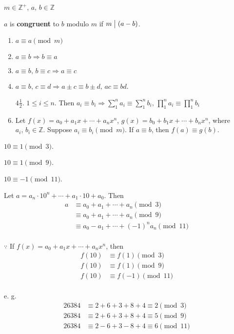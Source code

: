 
\begin{definition}
    $m \in \mathbb{Z}^+$, $a,\,b \in \mathbb{Z}$

    $a$ is \textbf{congruent} to $b$ modulo $m$ if $m \bigm| \left(a-b\right)$.
\end{definition}

\begin{theorem}
    \begin{enumerate}
        \item $a \equiv a\pmod{m}$
        \item $a \equiv b \Rightarrow b \equiv a$
        \item $a \equiv b,\, b \equiv c \Rightarrow a \equiv c$
        \item $a \equiv b,\, c \equiv d \Rightarrow a \pm c \equiv b \pm d,\, ac \equiv bd$.
        \item[$\mathit{4\frac{1}{2}}$.] $1 \leq i \leq n$. Then
        $a_i \equiv b_i \Rightarrow \sum_1^n a_i \equiv \sum_1^n b_i,\, \prod_1^n a_i \equiv \prod_1^n b_i$ 
        \item Let $f\left(x\right) = a_0 + a_1x + \cdots + a_nx^n$, $g\left(x\right) = b_0 + b_1x + \cdots + b_nx^n$,
        where $a_i,\,b_i \in \mathbb{Z}$. Suppose $a_i \equiv b_i\pmod{m}$. If $a \equiv b$, then $f\left(a\right) \equiv g\left(b\right)$.
    \end{enumerate}
\end{theorem}

\begin{example}
    $10 \equiv 1\pmod{3}$.

    $10 \equiv 1\pmod{9}$.
    
    $10 \equiv -1\pmod{11}$.

    Let $a=a_n \cdot 10^n+\cdots+a_1 \cdot 10+a_0$. Then
    \begin{align*}
        a &\equiv a_0 + a_1 + \cdots + a_n \pmod{3} \\
        &\equiv a_0 + a_1 + \cdots + a_n \pmod{9} \\
        &\equiv a_0 - a_1 + \cdots + \left(-1\right)^n a_n \pmod{11} \\
    \end{align*}

    $\because$ If $f\left(x\right)=a_0+a_1x+\cdots+a_nx^n$, then
    \begin{align*}
        f\left(10\right) &\equiv f\left(1\right) \pmod{3} \\
        f\left(10\right) &\equiv f\left(1\right) \pmod{9} \\
        f\left(10\right) &\equiv f\left(-1\right) \pmod{11} \\
    \end{align*}

    e. g. 
    \begin{align*}
        26384 &\equiv 2+6+3+8+4 \equiv 2 \pmod{3} \\
        26384 &\equiv 2+6+3+8+4 \equiv 5 \pmod{9} \\
        26384 &\equiv 2-6+3-8+4 \equiv 6 \pmod{11} \\
    \end{align*}
\end{example}


